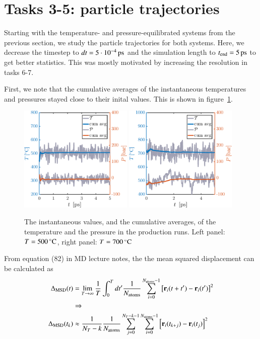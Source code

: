 \section*{Tasks 3-5: particle trajectories}
Starting with the temperature- and pressure-equilibrated systems from the previous section, we study the particle trajectories for both systems. Here, we decrease the timestep to   $dt       = \unit[5\cdot 10^{-4}]{ps}$ and the simulation length to $t_{\rm end} = \unit[5]{ps}$ to get better statistics. This was mostly motivated by increasing the resolution in tasks 6-7. 

First, we note that the cumulative averages of the instantaneous temperatures and pressures stayed close to their inital values. This is shown in figure~\ref{fig:prod}.
\begin{figure}[!ht]
\begin{center}
  \includegraphics[width=0.48\textwidth]{../figures/TP-prod-500} 
    \includegraphics[width=0.48\textwidth]{../figures/TP-prod-700} 
  \caption{The instantaneous values, and the cumulative averages, of the temperature and the pressure in the production runs. Left panel: $T=\unit[500]{^\circ C}$,  right panel: $T=\unit[700]{^\circ C}$}
  \label{fig:prod}
\end{center}
\end{figure}

From equation (82) in MD lecture notes, the the mean squared displacement can be calculated as
\begin{align}
\Delta_{\rm MSD}(t) &= \lim_{T \rightarrow \infty} \frac{1}{T} \int_0^{T} d t' \frac{1}{N_{\rm atoms}} \sum_{i=0}^{N_{\rm atoms}-1} \left[{\bf r}_i(t+t') - {\bf r}_i(t') \right]^2 \\ &\Rightarrow \nonumber
\\
\Delta_{\rm MSD}(t_k) &\approx
\frac{1}{N_T -k}\frac{1}{N_{\rm atoms}} \sum_{j=0}^{N_T-k-1} \sum_{i=0}^{N_{\rm atoms}-1} \left[{\bf r}_i(t_{k+j}) - {\bf r}_i(t_j) \right]^2 
\label{eq:1}
\end{align}

